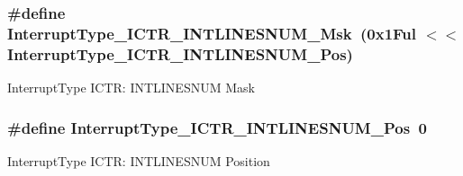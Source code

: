 \subsubsection[{\texorpdfstring{Interrupt\+Type\+\_\+\+I\+C\+T\+R\+\_\+\+I\+N\+T\+L\+I\+N\+E\+S\+N\+U\+M\+\_\+\+Msk}{InterruptType_ICTR_INTLINESNUM_Msk}}]{\setlength{\rightskip}{0pt plus 5cm}\#define Interrupt\+Type\+\_\+\+I\+C\+T\+R\+\_\+\+I\+N\+T\+L\+I\+N\+E\+S\+N\+U\+M\+\_\+\+Msk~(0x1\+Ful $<$$<$ Interrupt\+Type\+\_\+\+I\+C\+T\+R\+\_\+\+I\+N\+T\+L\+I\+N\+E\+S\+N\+U\+M\+\_\+\+Pos)}\hypertarget{group__CMSIS__CM3__InterruptType_ga0a2c325cefdab97bd8ce3336a66a803e}{}\label{group__CMSIS__CM3__InterruptType_ga0a2c325cefdab97bd8ce3336a66a803e}
Interrupt\+Type I\+C\+TR\+: I\+N\+T\+L\+I\+N\+E\+S\+N\+UM Mask 
\subsubsection[{\texorpdfstring{Interrupt\+Type\+\_\+\+I\+C\+T\+R\+\_\+\+I\+N\+T\+L\+I\+N\+E\+S\+N\+U\+M\+\_\+\+Pos}{InterruptType_ICTR_INTLINESNUM_Pos}}]{\setlength{\rightskip}{0pt plus 5cm}\#define Interrupt\+Type\+\_\+\+I\+C\+T\+R\+\_\+\+I\+N\+T\+L\+I\+N\+E\+S\+N\+U\+M\+\_\+\+Pos~0}\hypertarget{group__CMSIS__CM3__InterruptType_ga5d164b3cb981bd85afd35892d180a5c3}{}\label{group__CMSIS__CM3__InterruptType_ga5d164b3cb981bd85afd35892d180a5c3}
Interrupt\+Type I\+C\+TR\+: I\+N\+T\+L\+I\+N\+E\+S\+N\+UM Position 